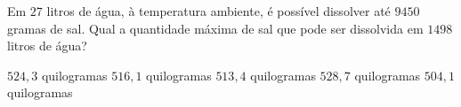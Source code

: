 Em $27$ litros de água, à temperatura ambiente, é possível dissolver até $9450$ gramas de sal. Qual a quantidade máxima de sal que pode ser dissolvida em $1498$ litros de água?

$524{,}3$ quilogramas
$516{,}1$ quilogramas
$513{,}4$ quilogramas
$528{,}7$ quilogramas
$504{,}1$ quilogramas



